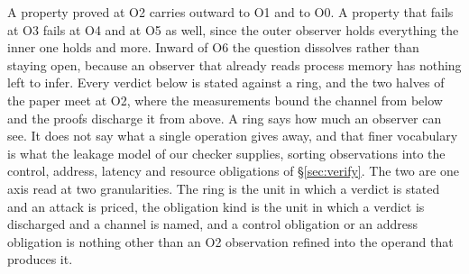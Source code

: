 A property proved at O2 carries outward to O1 and to O0.
A property that fails at O3 fails at O4 and at O5 as well, since the outer observer holds everything the inner one holds and more.
Inward of O6 the question dissolves rather than staying open, because an observer that already reads process memory has nothing left to infer.
Every verdict below is stated against a ring, and the two halves of the paper meet at O2, where the measurements bound the channel from below and the proofs discharge it from above.
A ring says how much an observer can see.
It does not say what a single operation gives away, and that finer vocabulary is what the leakage model of our checker supplies, sorting observations into the control, address, latency and resource obligations of \S\ref{sec:verify}.
The two are one axis read at two granularities.
The ring is the unit in which a verdict is stated and an attack is priced, the obligation kind is the unit in which a verdict is discharged and a channel is named, and a control obligation or an address obligation is nothing other than an O2 observation refined into the operand that produces it.
